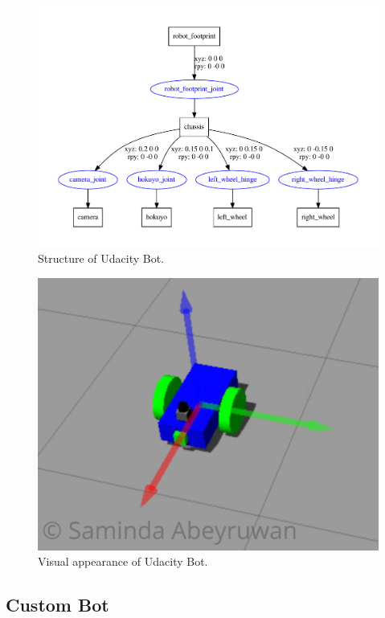 \documentclass[10pt,journal,compsoc]{IEEEtran}
\begin{document}
\begin{figure}[thpb]
      \centering
      \includegraphics[width=\linewidth]{misc/udacity_bot.pdf}
      \caption{Structure of Udacity Bot.}
      \label{fig:udacity_bot}
\end{figure}

\begin{figure}[thpb]
      \centering
      \includegraphics[width=\linewidth]{misc/ub_w.png}
      \caption{Visual appearance of Udacity Bot.}
      \label{fig:ub}
\end{figure}

\subsection{Custom Bot}
\end{document}
